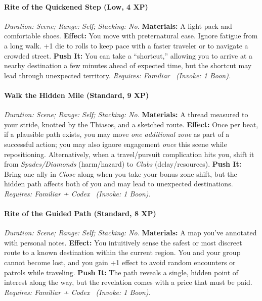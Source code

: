 \paragraph{Rite of the Quickened Step (Low, 4 XP)} \emph{Duration: Scene; Range: Self; Stacking: No.}
\textbf{Materials:} A light pack and comfortable shoes.
\textbf{Effect:} You move with preternatural ease. Ignore fatigue from a long walk. +1 die to rolls to keep pace with a faster traveler or to navigate a crowded street.
\textbf{Push It:} You can take a ``shortcut,'' allowing you to arrive at a nearby destination a few minutes ahead of expected time, but the shortcut may lead through unexpected territory.
\emph{Requires: Familiar \ (\textit{Invoke:} 1 Boon).}
\paragraph{Walk the Hidden Mile (Standard, 9 XP)} \emph{Duration: Scene; Range: Self; Stacking: No.}
\textbf{Materials:} A thread measured to your stride, knotted by the Thiasos, and a sketched route.
\textbf{Effect:} Once per beat, if a plausible path exists, you may move \emph{one additional zone} as part of a successful action; you may also ignore engagement \emph{once} this scene while repositioning. Alternatively, when a travel/pursuit complication hits you, shift it from \emph{Spades/Diamonds} (harm/hazard) to \emph{Clubs} (delay/resources).
\textbf{Push It:} Bring one ally in \emph{Close} along when you take your bonus zone shift, but the hidden path affects both of you and may lead to unexpected destinations.
\emph{Requires: Familiar + Codex \ (\textit{Invoke:} 1 Boon).}
\paragraph{Rite of the Guided Path (Standard, 8 XP)} \emph{Duration: Scene; Range: Self; Stacking: No.}
\textbf{Materials:} A map you've annotated with personal notes.
\textbf{Effect:} You intuitively sense the safest or most discreet route to a known destination within the current region. You and your group cannot become lost, and you gain +1 effect to avoid random encounters or patrols while traveling.
\textbf{Push It:} The path reveals a single, hidden point of interest along the way, but the revelation comes with a price that must be paid.
\emph{Requires: Familiar + Codex \ (\textit{Invoke:} 1 Boon).}
